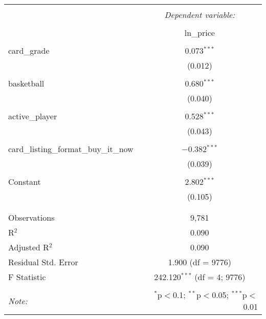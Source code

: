 
\begin{table}[!htbp] \centering 
  \caption{} 
  \label{} 
\begin{tabular}{@{\extracolsep{5pt}}lc} 
\\[-1.8ex]\hline 
\hline \\[-1.8ex] 
 & \multicolumn{1}{c}{\textit{Dependent variable:}} \\ 
\cline{2-2} 
\\[-1.8ex] & ln\_price \\ 
\hline \\[-1.8ex] 
 card\_grade & 0.073$^{***}$ \\ 
  & (0.012) \\ 
  & \\ 
 basketball & 0.680$^{***}$ \\ 
  & (0.040) \\ 
  & \\ 
 active\_player & 0.528$^{***}$ \\ 
  & (0.043) \\ 
  & \\ 
 card\_listing\_format\_buy\_it\_now & $-$0.382$^{***}$ \\ 
  & (0.039) \\ 
  & \\ 
 Constant & 2.802$^{***}$ \\ 
  & (0.105) \\ 
  & \\ 
\hline \\[-1.8ex] 
Observations & 9,781 \\ 
R$^{2}$ & 0.090 \\ 
Adjusted R$^{2}$ & 0.090 \\ 
Residual Std. Error & 1.900 (df = 9776) \\ 
F Statistic & 242.120$^{***}$ (df = 4; 9776) \\ 
\hline 
\hline \\[-1.8ex] 
\textit{Note:}  & \multicolumn{1}{r}{$^{*}$p$<$0.1; $^{**}$p$<$0.05; $^{***}$p$<$0.01} \\ 
\end{tabular} 
\end{table} 
